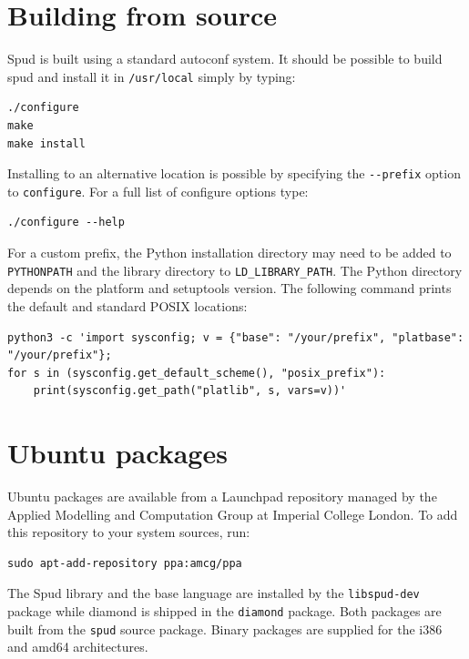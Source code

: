\documentclass[a4paper, 11pt]{book}
\begin{document}
\section{Building from source}

Spud is built using a standard autoconf system. It should be possible to
build spud and install it in \verb+/usr/local+ simply by typing:

\begin{verbatim}
./configure
make
make install
\end{verbatim}

Installing to an alternative location is possible by specifying the
\verb+--prefix+ option to \verb+configure+. For a full list of configure
options type:

\begin{verbatim}
./configure --help
\end{verbatim}

For a custom prefix, the Python installation directory may need to be added
to \verb+PYTHONPATH+ and the library directory to \verb+LD_LIBRARY_PATH+.
The Python directory depends on the platform and setuptools version. The
following command prints the default and standard POSIX locations:

\begin{verbatim}
python3 -c 'import sysconfig; v = {"base": "/your/prefix", "platbase": "/your/prefix"};
for s in (sysconfig.get_default_scheme(), "posix_prefix"):
    print(sysconfig.get_path("platlib", s, vars=v))'
\end{verbatim}

\section{Ubuntu packages}

Ubuntu packages are available from a Launchpad repository managed by the Applied Modelling and Computation
Group at Imperial College London. To add this repository to your system sources, run:

\begin{verbatim}
sudo apt-add-repository ppa:amcg/ppa
\end{verbatim}

The Spud library and the base language are installed by the
\verb+libspud-dev+ package while diamond is shipped in the \verb+diamond+
package. Both packages are built from the \verb+spud+ source package. Binary
packages are supplied for the i386 and amd64 architectures.
\end{document}
